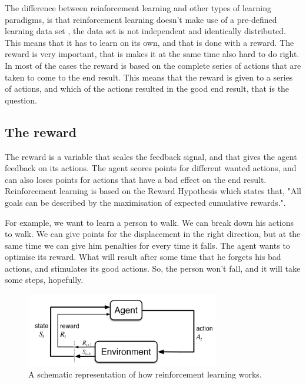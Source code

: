 \documentclass{report}
\begin{document}

The difference between reinforcement learning and other types of learning paradigms, is that reinforcement learning doesn't make use of a pre-defined learning data set \cite[2]{Sutton2018} , the data set is not independent and identically distributed. This means that it has to learn on its own, and that is done with a reward. The reward is very important, that is makes it at the same time also hard to do right. In most of the cases the reward is based on the complete series of actions that are taken to come to the end result. This means that the reward is given to a series of actions, and which of the actions resulted in the good end result, that is the question.

\subsection{The reward}
The reward is a variable that scales the feedback signal, and that gives the agent feedback on its actions. The agent scores points for different wanted actions, and can also loses points for actions that have a bad effect on the end result. Reinforcement learning is based on the Reward Hypothesis which states that, "All goals can be described by the maximisation of expected cumulative rewards."\cite{RL_intro}.

For example, we want to learn a person to walk. We can break down his actions to walk. We can give points for the displacement in the right direction, but at the same time we can give him penalties for every time it falls. The agent wants to optimise its reward. What will result after some time that he forgets his bad actions, and stimulates its good actions. So, the person won’t fall, and it will take some steps, hopefully.

\begin{figure}
    \centering
    \includegraphics[width=0.75\textwidth]{verslag/images/reinforcement_learning_diagram.png}
    \caption{A schematic representation of how reinforcement learning works.\cite{RLimg}}
    \label{fig:reinforcement_diagram}
\end{figure}
\end{document}
